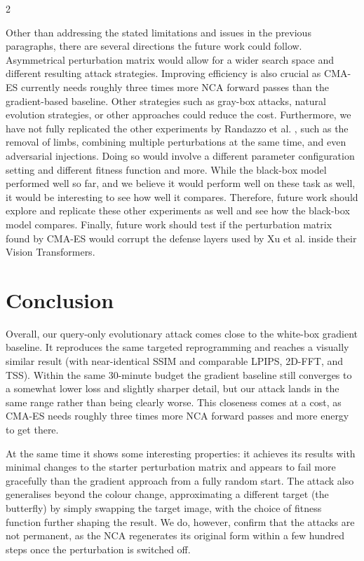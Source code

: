\documentclass{article}
\begin{document}
\begin{multicols}{2}

Other than addressing the stated limitations and issues in the previous paragraphs, there are several directions the future work could follow.
Asymmetrical perturbation matrix would allow for a wider search space and different resulting attack strategies.
Improving efficiency is also crucial as CMA-ES currently needs roughly three times more NCA forward passes than the gradient-based baseline. Other strategies such as gray-box attacks, natural evolution strategies, or other approaches could reduce the cost.
Furthermore, we have not fully replicated the other experiments by Randazzo et al. \cite{randazzo2021adversarial}, such as the removal of limbs, combining multiple perturbations at the same time, and even adversarial injections.
Doing so would involve a different parameter configuration setting and different fitness function and more. While the black-box model performed well so far, and we believe it would perform well on these task as well, it would be interesting to see how well it compares.
Therefore, future work should explore and replicate these other experiments as well and see how the black-box model compares.
Finally, future work should test if the perturbation matrix found by CMA-ES would corrupt the defense layers used by Xu et al. \cite{xu2024adanca} inside their Vision Transformers.

\section*{Conclusion}

Overall, our query-only evolutionary attack comes close to the white-box gradient baseline. It reproduces the same targeted reprogramming and reaches a visually similar result (with near-identical SSIM and comparable LPIPS, 2D-FFT, and TSS). Within the same 30-minute budget the gradient baseline still converges to a somewhat lower loss and slightly sharper detail, but our attack lands in the same range rather than being clearly worse. This closeness comes at a cost, as CMA-ES needs roughly three times more NCA forward passes and more energy to get there. 

At the same time it shows some interesting properties: it achieves its results with minimal changes to the starter perturbation matrix and appears to fail more gracefully than the gradient approach from a fully random start. The attack also generalises beyond the colour change, approximating a different target (the butterfly) by simply swapping the target image, with the choice of fitness function further shaping the result. We do, however, confirm that the attacks are not permanent, as the NCA regenerates its original form within a few hundred steps once the perturbation is switched off.


\end{multicols}
\end{document}
